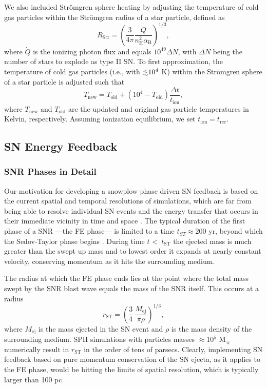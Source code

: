 \documentclass[iop]{emulateapj}
\newcommand{\lapprox }{{\lower0.8ex\hbox{$\buildrel <\over\sim$}}}
\begin{document}
We also included Str\"omgren sphere heating by adjusting the temperature of cold gas particles within the Str\"omgren radius of a star particle, defined as
\begin{equation}\label{stromgren}
  R_{\mathrm{Str}} = \left(\frac{3}{4\pi}\frac{\dot Q}{{n_{\mathrm{H}}^2} \alpha_{\mathrm{B}}}\right)^{1/3},
\end{equation}
where $\dot Q$ is the ionizing photon flux and equals $10^{49} \Delta N$, with $\Delta N$ being the number of stars to explode as type II SN. To first approximation, the temperature of cold gas particles (i.e., with $\lapprox10^4$ K) within the Str\"omgren sphere of a star particle is adjusted such that
\begin{equation}\label{Tstromgren}
  T_{\mathrm{new}} = T_{\mathrm{old}} + (10^4 - T_{\mathrm{old}}) \frac{\Delta t}{t_{\mathrm{ion}}},
\end{equation}
where $T_{\mathrm{new}}$ and $T_{\mathrm{old}}$ are the updated and original gas particle temperatures in Kelvin, respectively. Assuming ionization equilibrium, we set $t_{\mathrm{ion}}=t_{\mathrm{rec}}$.

\subsection{SN Energy Feedback}\label{subsec:snfeedback}

\subsubsection{SNR Phases in Detail}\label{subsubsec:phases}
Our motivation for developing a snowplow phase driven SN feedback is based on the current spatial and temporal resolutions of simulations, which are far from being able to resolve individual SN events and the energy transfer that occurs in their immediate vicinity in time and space \citep[for a general review of the SNR phases, see][]{Ostriker88}. The typical duration of the first phase of a SNR ---the FE phase--- is limited to a time $t_{ST}\approx200$ yr, beyond which the Sedov-Taylor phase begins  \citep[see equation 39.3 of][]{Draine11}. During time $t$ \textless\ $t_{\mathrm{ST}}$ the ejected mass is much greater than the swept up mass and to lowest order it expands at nearly constant velocity, conserving momentum as it hits the surrounding medium.

The radius at which the FE phase ends lies at the point where the total mass swept by the SNR blast wave equals the mass of the SNR itself. This occurs at a radius
\begin{equation}\label{FEradius}
  r_{\mathrm{ST}} = \left(\frac{3}{4}\ \frac{M_{\mathrm{ej}}}{\pi\rho}\right)^{1/3},
\end{equation}
where $M_{\mathrm{ej}}$ is the mass ejected in the SN event and $\rho$ is the mass density of the surrounding medium. SPH simulations with particles masses $\approx$10$^5$ M$_{\sun}$ numerically result in $r_{\mathrm{ST}}$ in the order of tens of parsecs. Clearly, implementing SN feedback based on pure momentum conservation of the SN ejecta, as it applies to the FE phase, would be hitting the limits of spatial resolution, which is typically larger than 100 pc.
\end{document}
